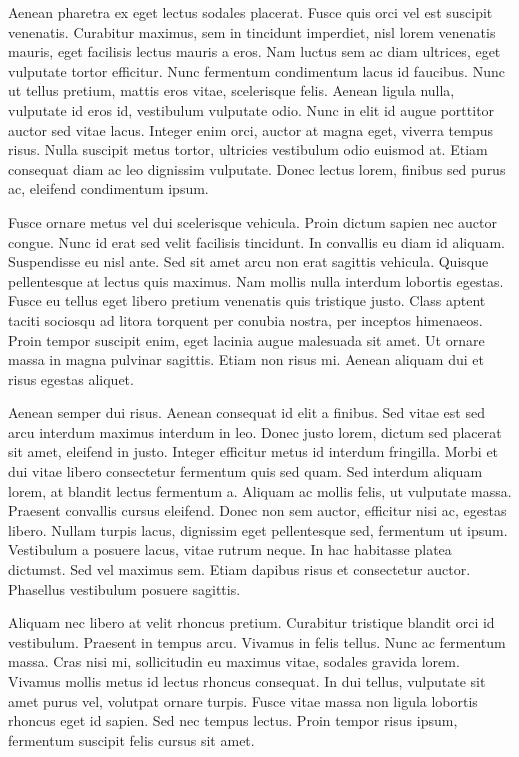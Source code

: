 Aenean pharetra ex eget lectus sodales placerat. Fusce quis orci vel est suscipit venenatis. Curabitur maximus, sem in tincidunt imperdiet, nisl lorem venenatis mauris, eget facilisis lectus mauris a eros. Nam luctus sem ac diam ultrices, eget vulputate tortor efficitur. Nunc fermentum condimentum lacus id faucibus. Nunc ut tellus pretium, mattis eros vitae, scelerisque felis. Aenean ligula nulla, vulputate id eros id, vestibulum vulputate odio. Nunc in elit id augue porttitor auctor sed vitae lacus. Integer enim orci, auctor at magna eget, viverra tempus risus. Nulla suscipit metus tortor, ultricies vestibulum odio euismod at. Etiam consequat diam ac leo dignissim vulputate. Donec lectus lorem, finibus sed purus ac, eleifend condimentum ipsum.

Fusce ornare metus vel dui scelerisque vehicula. Proin dictum sapien nec auctor congue. Nunc id erat sed velit facilisis tincidunt. In convallis eu diam id aliquam. Suspendisse eu nisl ante. Sed sit amet arcu non erat sagittis vehicula. Quisque pellentesque at lectus quis maximus. Nam mollis nulla interdum lobortis egestas. Fusce eu tellus eget libero pretium venenatis quis tristique justo. Class aptent taciti sociosqu ad litora torquent per conubia nostra, per inceptos himenaeos. Proin tempor suscipit enim, eget lacinia augue malesuada sit amet. Ut ornare massa in magna pulvinar sagittis. Etiam non risus mi. Aenean aliquam dui et risus egestas aliquet.

Aenean semper dui risus. Aenean consequat id elit a finibus. Sed vitae est sed arcu interdum maximus interdum in leo. Donec justo lorem, dictum sed placerat sit amet, eleifend in justo. Integer efficitur metus id interdum fringilla. Morbi et dui vitae libero consectetur fermentum quis sed quam. Sed interdum aliquam lorem, at blandit lectus fermentum a. Aliquam ac mollis felis, ut vulputate massa. Praesent convallis cursus eleifend. Donec non sem auctor, efficitur nisi ac, egestas libero. Nullam turpis lacus, dignissim eget pellentesque sed, fermentum ut ipsum. Vestibulum a posuere lacus, vitae rutrum neque. In hac habitasse platea dictumst. Sed vel maximus sem. Etiam dapibus risus et consectetur auctor. Phasellus vestibulum posuere sagittis.

Aliquam nec libero at velit rhoncus pretium. Curabitur tristique blandit orci id vestibulum. Praesent in tempus arcu. Vivamus in felis tellus. Nunc ac fermentum massa. Cras nisi mi, sollicitudin eu maximus vitae, sodales gravida lorem. Vivamus mollis metus id lectus rhoncus consequat. In dui tellus, vulputate sit amet purus vel, volutpat ornare turpis. Fusce vitae massa non ligula lobortis rhoncus eget id sapien. Sed nec tempus lectus. Proin tempor risus ipsum, fermentum suscipit felis cursus sit amet.

